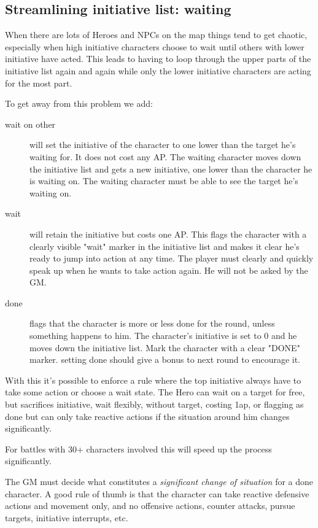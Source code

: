\subsection*{Streamlining initiative list: waiting}
When there are lots of Heroes and NPCs on the map things tend to get chaotic, especially when high initiative characters choose to wait until others with lower initiative have acted. This leads to having to loop through the upper parts of the initiative list again and again while only the lower initiative characters are acting for the most part.

To get away from this problem we add:
\begin{description}
\item[wait on other] will set the initiative of the character to one lower than the target he's waiting for. It does not cost any AP. The waiting character moves down the initiative list and gets a new initiative, one lower than the character he is waiting on. The waiting character must be able to see the target he's waiting on.
\item[wait] will retain the initiative but costs one AP. This flags the character with a clearly visible "wait" marker in the initiative list and makes it clear he's ready to jump into action at any time. The player must clearly and quickly speak up when he wants to take action again. He will not be asked by the GM.
\item[done] flags that the character is more or less done for the round, unless something happens to him. The character's initiative is set to 0 and he moves down the initiative list. Mark the character with a clear "DONE" marker.
\todo setting done should give a bonus to next round to encourage it.
\end{description}

With this it's possible to enforce a rule where the top initiative always have to take some action or choose a wait state. The Hero can wait on a target for free, but sacrifices initiative, wait flexibly, without target, costing 1ap, or flagging as done but can only take reactive actions if the situation around him changes significantly.

For battles with 30+ characters involved this will speed up the process significantly.

The GM must decide what constitutes a \emph{significant change of situation} for a done character. A good rule of thumb is that the character can take reactive defensive actions and movement only, and no offensive actions, counter attacks, pursue targets, initiative interrupts, etc.

